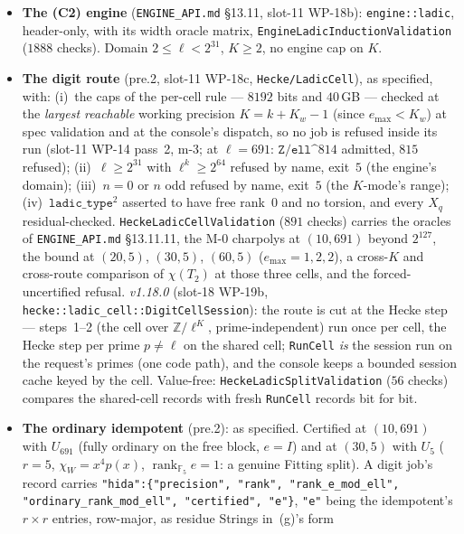 \documentclass[11pt]{article}
\theoremstyle{remark}
\newcommand{\F}{\mathbb{F}}
\newcommand{\Z}{\mathbb{Z}}
\DeclareMathOperator{\rank}{rank}
\begin{document}
\begin{itemize}
  pre-existing undefined shift in \texttt{ExactKthRoot} at $k<2$ (reached by no pipeline caller) was made
  defined with the observed result.
\item \textbf{The (C2) engine} (\texttt{ENGINE\_API.md} \S13.11, slot-11 WP-18b):
  \texttt{engine::ladic}, header-only, with its width oracle matrix, \texttt{EngineLadicInductionValidation}
  ($1888$ checks). Domain $2\le\ell<2^{31}$, $K\ge2$, no engine cap on $K$.
\item \textbf{The digit route} (pre.2, slot-11 WP-18c, \texttt{Hecke/LadicCell}), as specified, with:
  (i)~the caps of the per-cell rule --- $8192$ bits and $40$\,GB --- checked at the \emph{largest reachable}
  working precision $K=k+K_w-1$ (since $e_{\max}<K_w$) at spec validation and at the console's dispatch,
  so no job is refused inside its run (slot-11 WP-14 pass~2, m-3; at $\ell=691$: $\texttt{Z/ell\textasciicircum}814$
  admitted, $815$ refused); (ii)~$\ell\ge2^{31}$ with $\ell^k\ge2^{64}$ refused by name, exit~$5$ (the
  engine's domain); (iii)~$n=0$ or $n$ odd refused by name, exit~$5$ (the $K$-mode's range);
  (iv)~$\texttt{ladic\_type}^2$ asserted to have free rank~$0$ and no torsion, and every $X_q$ residual-checked.
  \texttt{HeckeLadicCellValidation} ($891$ checks) carries the oracles of \texttt{ENGINE\_API.md}
  \S13.11.11, the M-0 charpolys at $(10,691)$ beyond $2^{127}$, the bound at $(20,5)$, $(30,5)$, $(60,5)$
  ($e_{\max}=1,2,2$), a cross-$K$ and cross-route comparison of $\chi(T_2)$ at those three cells, and the
  forced-uncertified refusal.
\emph{v1.18.0} (slot-18 WP-19b, \texttt{hecke::ladic\_cell::DigitCellSession}): the route is cut at the Hecke step --- steps~1--2 (the cell over $\Z/\ell^{K}$, prime-independent) run once per cell, the Hecke step per prime $p\ne\ell$ on the shared cell; \texttt{RunCell} \emph{is} the session run on the request's primes (one code path), and the console keeps a bounded session cache keyed by the cell. Value-free: \texttt{HeckeLadicSplitValidation} ($56$ checks) compares the shared-cell records with fresh \texttt{RunCell} records bit for bit.
\item \textbf{The ordinary idempotent} (pre.2): as specified. Certified at $(10,691)$ with $U_{691}$
  (fully ordinary on the free block, $e=I$) and at $(30,5)$ with $U_5$ ($r=5$, $\chi_W=x^{4}p(x)$,
  $\rank_{\F_5}e=1$: a genuine Fitting split). A digit job's record carries
  \texttt{"hida":\{"precision", "rank", "rank\_e\_mod\_ell", "ordinary\_rank\_mod\_ell", "certified", "e"\}},
  \texttt{"e"} being the idempotent's $r\times r$ entries, row-major, as residue Strings in~(g)'s form

\end{itemize}
\end{document}

